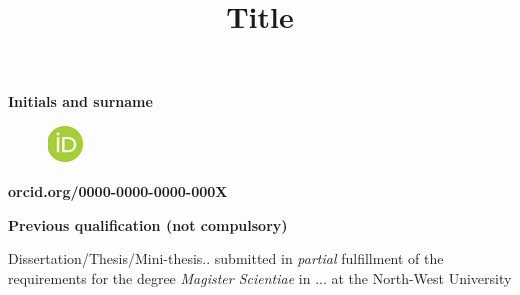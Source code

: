 \documentclass[12pt]{report}
\title{Title}
\date{}
\begin{document}
\maketitle
\par


\vspace{\baselineskip}

\vspace{\baselineskip}

\vspace{\baselineskip}
\setlength{\parskip}{6.0pt}
\begin{Center}
{\fontsize{18pt}{21.6pt}\selectfont \textbf{Initials and surname}\par}
\end{Center}\par




\begin{figure}[H]
	\begin{Center}
		\includegraphics[width=0.39in,height=0.39in]{./media/image1.png}
	\end{Center}
\end{figure}



\begin{Center}
 {\fontsize{18pt}{21.6pt}\selectfont \textbf{orcid.org/\textcolor[HTML]{FF0000}{0000-0000-0000-000X}}\par}
\end{Center}\par

\begin{Center}
{\fontsize{18pt}{21.6pt}\selectfont \textbf{Previous qualification (not compulsory)}\par}
\end{Center}\par


\vspace{\baselineskip}
\setlength{\parskip}{0pt}

\vspace{\baselineskip}
\begin{Center}
{\fontsize{16pt}{19.2pt}\selectfont Dissertation/Thesis/Mini-thesis.. submitted in \textit{\textcolor[HTML]{1F497D}{partial}}\textcolor[HTML]{1F497D}{ }fulfillment of the requirements for the degree \textit{\textcolor[HTML]{1F497D}{Magister Scientiae}} in ... at the North-West University\par}
\end{Center}\par
\end{document}
